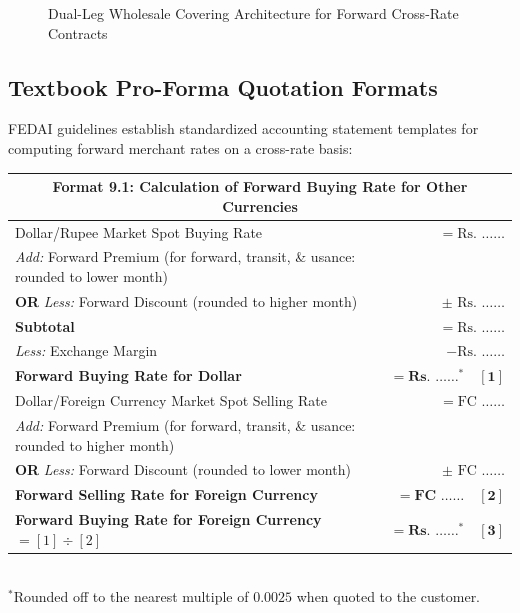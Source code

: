 \begin{figure}[htbp]
{%
    }
    \caption{Dual-Leg Wholesale Covering Architecture for Forward Cross-Rate Contracts}
    \label{fig:forward_cross_rate_covering}
\end{figure}

\clearpage
\subsection{Textbook Pro-Forma Quotation Formats}
FEDAI guidelines establish standardized accounting statement templates for computing forward merchant rates on a cross-rate basis:

\begin{center}
\small
\begin{tabularx}{0.96\linewidth}{Xr}
    \toprule
    \multicolumn{2}{c}{\textbf{Format 9.1: Calculation of Forward Buying Rate for Other Currencies}} \\
    \midrule
    Dollar/Rupee Market Spot Buying Rate & $= \text{Rs. } \dots\dots$ \\
    \textit{Add:} Forward Premium (for forward, transit, \& usance: rounded to lower month) & \\
    \quad\textbf{OR} \textit{Less:} Forward Discount (rounded to higher month) & $\pm\text{ Rs. } \dots\dots$ \\
    \midrule
    \textbf{Subtotal} & $= \text{Rs. } \dots\dots$ \\
    \textit{Less:} Exchange Margin & $- \text{Rs. } \dots\dots$ \\
    \midrule
    \textbf{Forward Buying Rate for Dollar} & $\mathbf{= \text{Rs. } \dots\dots^\ast \quad [1]}$ \\
    \midrule
    Dollar/Foreign Currency Market Spot Selling Rate & $= \text{FC } \dots\dots$ \\
    \textit{Add:} Forward Premium (for forward, transit, \& usance: rounded to higher month) & \\
    \quad\textbf{OR} \textit{Less:} Forward Discount (rounded to lower month) & $\pm\text{ FC } \dots\dots$ \\
    \midrule
    \textbf{Forward Selling Rate for Foreign Currency} & $\mathbf{= \text{FC } \dots\dots \quad [2]}$ \\
    \midrule
    \textbf{Forward Buying Rate for Foreign Currency} $= [1] \div [2]$ & $\mathbf{= \text{Rs. } \dots\dots^\ast \quad [3]}$ \\
    \bottomrule
\end{tabularx}\\[0.3em]
{\footnotesize $^\ast$Rounded off to the nearest multiple of $0.0025$ when quoted to the customer.}
\end{center}

